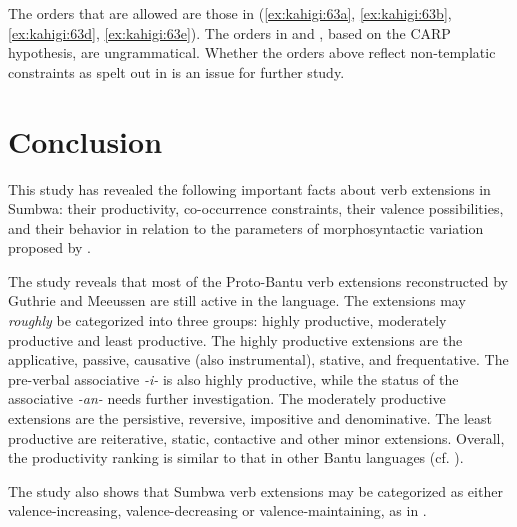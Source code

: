 \documentclass[output=paper		  ]{langscibook}
\begin{document}
    \label{ex:kahigi:63f}
    \z
\z

{The orders that are allowed are those in (\ref{ex:kahigi:63a}, \ref{ex:kahigi:63b}, \ref{ex:kahigi:63d}, \ref{ex:kahigi:63e}). The orders in  and , based on the CARP hypothesis, are ungrammatical. Whether the orders above reflect non-templatic constraints as spelt out in \citet{Hyman2002} is an issue for further study.}

\section{Conclusion}\label{sec:kahigi:5}

{This study has revealed the following important facts about verb extensions in Sumbwa: their productivity, co-occurrence constraints, their valence possibilities, and their behavior in relation to the parameters of morphosyntactic variation proposed by \citet{GuéroisEtAl2017}.}

{The study reveals that most of the Proto-Bantu verb extensions reconstructed by Guthrie and Meeussen are still active in the language. The extensions may} {\textit{roughly}} be categorized into three groups: highly productive, moderately productive and least productive. The highly productive extensions are the applicative, passive, causative (also instrumental), stative, and frequentative. The pre-verbal associative {\textit{{}-i-}} is also highly productive, while the status of the associative {\textit{{}-an-} needs further investigation. The moderately productive extensions are the persistive, reversive, impositive and denominative. The least productive are reiterative, static, contactive and other minor extensions.} {Overall, the productivity ranking is similar to that in other Bantu languages (cf. \citealt{MagangaSchadeberg1992, Rugemalira1993runyambo,Rugemalira2005, Schadeberg2003, Stegen2002, Waweru2005, Chabata2007}).}

The study also shows that Sumbwa verb extensions may be categorized as either valence-increasing, valence-decreasing or valence-maintaining, as in .
\end{document}
